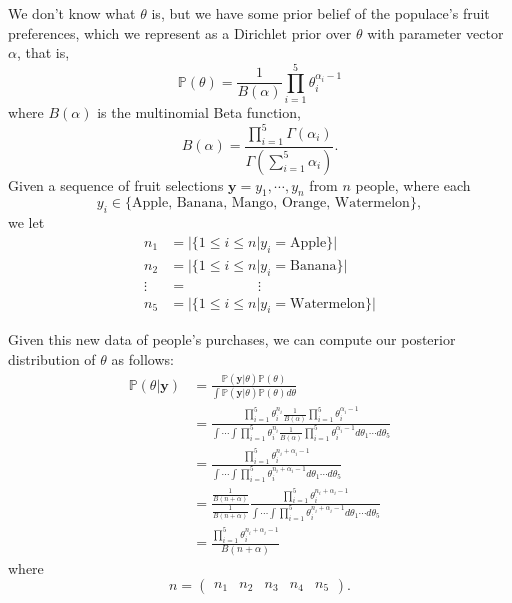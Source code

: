 We don't know what $\theta$ is, but we have some prior belief of the populace's fruit preferences, which we represent as a Dirichlet prior over $\theta$ with parameter vector $\alpha$, that is, $$\mathbb{P}(\theta) = \frac{1}{B(\alpha)} \prod_{i=1}^{5} \theta_{i}^{\alpha_{i} - 1}$$ where $B(\alpha)$ is the multinomial Beta function, $$B(\alpha) = \frac{\prod_{i=1}^{5} \Gamma(\alpha_{i})}{\Gamma(\sum_{i=1}^{5} \alpha_{i})}.$$ Given a sequence of fruit selections $\mathbf{y} = y_{1}, \cdots, y_{n}$ from $n$ people, where each $$y_{i} \in \{\text{Apple, Banana, Mango, Orange, Watermelon}\},$$ we let 
\begin{align*}
n_{1} & = |\{1 \leq i \leq n | y_{i} = \text{Apple}\}| \\
n_{2} & = |\{1 \leq i \leq n | y_{i} = \text{Banana}\}| \\
\vdots & = \; \; \; \; \; \; \; \; \; \; \; \; \; \; \; \; \; \; \vdots \\
n_{5} & = |\{1 \leq i \leq n | y_{i} = \text{Watermelon}\}|
\end{align*}

Given this new data of people's purchases, we can compute our posterior distribution of $\theta$ as follows:
\begin{align*}
\mathbb{P}(\theta | \mathbf{y}) & = \frac{\mathbb{P}(\mathbf{y} | \theta) \mathbb{P}(\theta)}{\int \mathbb{P}(\mathbf{y} | \theta) \mathbb{P}(\theta) d\theta} \\
& = \frac{\prod_{i=1}^{5} \theta_{i}^{n_{i}} \frac{1}{B(\alpha)} \prod_{i=1}^{5} \theta_{i}^{\alpha_{i}-1}}{\int \cdots \int \prod_{i=1}^{5} \theta_{i}^{n_{i}} \frac{1}{B(\alpha)} \prod_{i=1}^{5} \theta_{i}^{\alpha_{i}-1} d\theta_{1}\cdots d\theta_{5}} \\
& = \frac{\prod_{i=1}^{5} \theta_{i}^{n_{i} + \alpha_{i} - 1}}{\int \cdots \int \prod_{i=1}^{5} \theta_{i}^{n_{i} + \alpha_{i} - 1} d\theta_{1} \cdots d\theta_{5}} \\
& = \frac{\frac{1}{B(n + \alpha)}}{\frac{1}{B(n+\alpha)}} \frac{\prod_{i=1}^{5} \theta_{i}^{n_{i} + \alpha_{i} - 1}}{\int \cdots \int \prod_{i=1}^{5} \theta_{i}^{n_{i} + \alpha_{i} - 1} d\theta_{1} \cdots d\theta_{5}} \\
& = \frac{\prod_{i=1}^{5} \theta_{i}^{n_{i} + \alpha_{i} - 1}}{B(n + \alpha)}
\end{align*}
where $$n = \left( \begin{array}{ccccc} n_{1} & n_{2} & n_{3} & n_{4} & n_{5} \end{array} \right).$$

